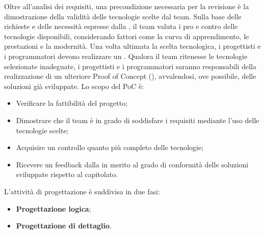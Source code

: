 \label{poc}
Oltre all’analisi dei requisiti, una precondizione necessaria per la revisione  è la dimostrazione della validità delle tecnologie scelte dal team. Sulla base delle richieste e delle necessità espresse dalla , il team valuta i pro e contro delle tecnologie disponibili, considerando fattori come la curva di apprendimento, le prestazioni e la modernità. Una volta ultimata la scelta tecnologica, i progettisti e i programmatori devono realizzare un . Qualora il team ritenesse le tecnologie selezionate inadeguate, i progettisti e i programmatori saranno responsabili della realizzazione di un ulteriore Proof of Concept (), avvalendosi, ove possibile, delle soluzioni già sviluppate. Lo scopo del PoC è:
\begin{itemize}
  \item Verificare la fattibilità del progetto;
  \item Dimostrare che il team è in grado di soddisfare i requisiti mediante l'uso delle tecnologie scelte;
  \item Acquisire un controllo quanto più completo delle tecnologie;
  \item Ricevere un feedback dalla  in merito al grado di conformità delle soluzioni sviluppate rispetto al capitolato.
\end{itemize}

\label{fasi-progettazione}
\par L'attività di progettazione è suddivisa in due fasi:
\begin{itemize}
  \item \textbf{Progettazione logica};
  \item \textbf{Progettazione di dettaglio}.
\end{itemize}

